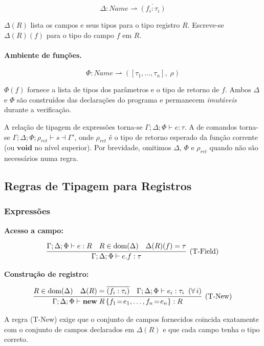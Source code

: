 \[
  \Delta : \mathit{Name} \rightharpoonup \overline{(f_i : \tau_i)}
\]

\(\Delta(R)\) lista os campos e seus tipos para o tipo registro \(R\).
Escreve-se \(\Delta(R)(f)\) para o tipo do campo \(f\) em \(R\).

\paragraph{Ambiente de funções.}

\[
  \Phi : \mathit{Name} \rightharpoonup ([\tau_1,\ldots,\tau_n],\; \rho)
\]

\(\Phi(f)\) fornece a lista de tipos dos parâmetros e o tipo de
retorno de \(f\). Ambos \(\Delta\) e \(\Phi\) são construídos das
declarações do programa e permanecem \emph{imutáveis} durante a
verificação.

A relação de tipagem de expressões torna-se
\(\Gamma;\Delta;\Phi \vdash e : \tau\).
A de comandos torna-se \(\Gamma;\Delta;\Phi;\rho_{\mathit{ret}}
\vdash s \dashv \Gamma'\), onde \(\rho_{\mathit{ret}}\) é o tipo de
retorno esperado da função corrente (ou \(\mathbf{void}\) no nível
superior). Por brevidade, omitimos \(\Delta\), \(\Phi\) e
\(\rho_{\mathit{ret}}\) quando não são necessários numa regra.

\subsection{Regras de Tipagem para Registros}

\subsubsection{Expressões}

\textbf{Acesso a campo:}

\[
  \infer[\text{(T-Field)}]
  {\Gamma;\Delta;\Phi \vdash e.f : \tau}
  {\Gamma;\Delta;\Phi \vdash e : R
   \quad R \in \mathrm{dom}(\Delta)
   \quad \Delta(R)(f) = \tau}
\]

\textbf{Construção de registro:}

\[
  \infer[\text{(T-New)}]
  {\Gamma;\Delta;\Phi \vdash \mathbf{new}\; R\,\{f_1\!=\!e_1,\ldots,f_n\!=\!e_n\} : R}
  {R \in \mathrm{dom}(\Delta)
   \quad \Delta(R) = \overline{(f_i:\tau_i)}
   \quad \Gamma;\Delta;\Phi \vdash e_i : \tau_i \;\;(\forall\,i)}
\]

A regra (T-New) exige que o conjunto de campos fornecidos coincida
exatamente com o conjunto de campos declarados em \(\Delta(R)\) e que
cada campo tenha o tipo correto.

